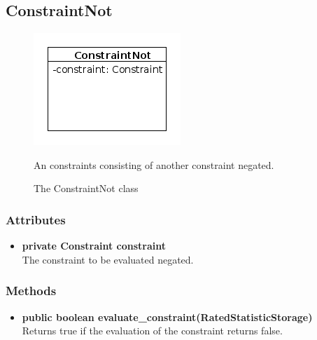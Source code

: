 \subsection{ConstraintNot}
\begin{figure}[htbp]
	\begin{minipage}[t]{8cm}
		\vspace{0pt}
		\centering
		\includegraphics[scale=0.6]{./diagram_pictures/reactor/ConstraintNot.png}
		\caption{The ConstraintNot class}
	\end{minipage}
	\hfill
	\begin{minipage}[t]{8cm}
		\vspace{10pt}
			An constraints consisting of another constraint negated.
	\end{minipage}
\end{figure}  

\subsubsection{Attributes}
\begin{itemize}
	\item \textbf{ private Constraint constraint }\\
	The constraint to be evaluated negated.
\end{itemize}
\subsubsection{Methods}
\begin{itemize}
	\item \textbf{ public boolean evaluate\_constraint(RatedStatisticStorage) }\\
	Returns true if the evaluation of the constraint returns false.
\end{itemize}


\newpage
